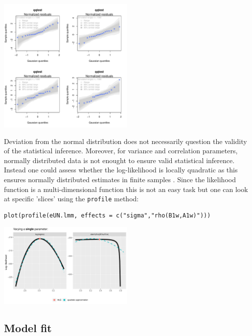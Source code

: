 \documentclass[12pt]{article}
\newcommand\Warning[1][3ex]{%
\renewcommand\stacktype{L}%
\scaleto{\stackon[1.3pt]{\color{red}$\triangle$}{\tiny\bfseries !}}{#1}%
\xspace
}
\begin{document}
\begin{center}
\includegraphics[width=0.5\textwidth]{./figures/diag-qqplot.pdf}
\end{center}

\Warning Deviation from the normal distribution does not necessarily
question the validity of the statistical inference. Moreover, for
variance and correlation parameters, normally distributed data is not
enought to ensure valid statistical inference. Instead one could
assess whether the log-likelihood is locally quadratic as this ensures
normally distributed estimates in finite samples
\citep{geyer2013asymptotics}. Since the likelihood function is a
multi-dimensional function this is not an easy task but one can look
at specific 'slices' using the \texttt{profile} method:

\lstset{language=r,label= ,caption= ,captionpos=b,numbers=none}
\begin{lstlisting}
plot(profile(eUN.lmm, effects = c("sigma","rho(B1w,A1w)")))
\end{lstlisting}


\begin{center}
\includegraphics[width=0.5\textwidth]{./figures/diag-profileUN.pdf}
\end{center}

\clearpage

\subsection{Model fit}
\label{sec:org75ba3c5}
\end{document}
